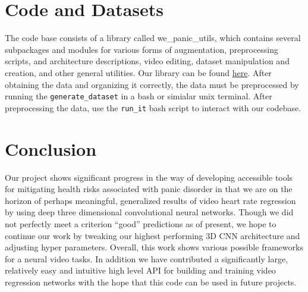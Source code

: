 \documentclass{article}
\begin{document}
\section[4]{Code and Datasets}
\noindent The code base consists of a library called we\_panic\_utils, which contains several subpackages and modules for various forms of augmentation, preprocessing scripts, and architecture descriptions, video editing, dataset manipulation and creation, and other general utilities. Our library can be found \href{https://github.com/danielberenberg/DeepLearning-BloodData}{here}. After obtaining the data and organizing it correctly, the data must be preprocessed by running the \texttt{generate\_dataset} in a bash or simialar unix terminal. After preprocessing the data, use the \texttt{run\_it} bash script to interact with our codebase.
\section[5]{Conclusion}
Our project shows significant progress in the way of developing accessible tools for mitigating health risks associated with panic disorder in that we are on the horizon of perhaps meaningful, generalized results of video heart rate regression by using deep three dimensional convolutional  neural networks. Though we did not perfectly meet a criterion ``good'' predictions as of present, we hope to continue our work by tweaking our highest performing 3D CNN architecture and adjusting hyper parameters. Overall, this work shows various possible frameworks for a neural video tasks. In addition we have contributed a significantly large, relatively easy and intuitive high level API for building and training video regression networks with the hope that this code can be used in future projects.
\newpage
\end{document}
